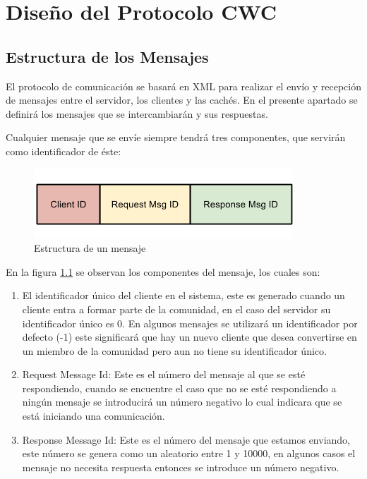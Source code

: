 
\chapter{Diseño del Protocolo CWC} %

\label{ch:diseno_cwc} %


\section{Estructura de los Mensajes}
\label{sec:estructura_protocolo_cwc}

El protocolo de comunicación se basará en XML para realizar el envío y recepción de mensajes entre el servidor, los clientes y las cachés. En el presente apartado se definirá los mensajes que se intercambiarán y sus respuestas.

Cualquier mensaje que se envíe siempre tendrá tres componentes, que servirán como identificador de éste:

\begin{figure}[h]
  \centering
    \includegraphics[scale=0.75]{gfx/EstructuraMensajeCWC}
  \caption{Estructura de un mensaje}
  \label{EstructuraMensajeCWC}
\end{figure}


En la figura \ref{EstructuraMensajeCWC} se observan los componentes del mensaje, los cuales son:

\begin{enumerate}
\item El identificador único del cliente en el sistema, este es generado cuando un cliente entra a formar parte de la comunidad, en el caso del servidor su identificador único es 0. En algunos mensajes se utilizará un identificador por defecto (-1) este significará que hay un nuevo cliente que desea convertirse en un miembro de la comunidad pero aun no tiene su identificador único.

\item Request Message Id: Este es el número del mensaje al que se esté respondiendo, cuando se encuentre el caso que no se esté respondiendo a ningún mensaje se introducirá un número negativo lo cual indicara que se está iniciando una comunicación.

\item Response Message Id: Este es el número del mensaje que estamos enviando, este número se genera como un aleatorio entre 1 y 10000, en algunos casos el mensaje no necesita respuesta entonces se introduce un número negativo.
\end{enumerate}

